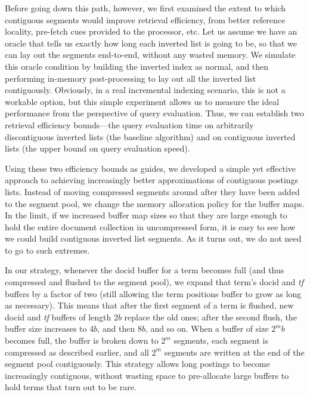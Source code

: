 Before going down this path, however, we first examined the extent to which contiguous segments would improve retrieval efficiency, from better reference locality, pre-fetch cues provided to the processor, etc. Let us assume we have an oracle that tells us exactly how long each inverted list is going to be, so that we can lay out the segments end-to-end, without any wasted memory. We simulate this oracle condition by building the inverted index as normal, and then performing in-memory post-processing to lay out all the inverted list contiguously. Obviously, in a real incremental indexing scenario, this is not a workable option, but this simple experiment allows us to measure the ideal performance from the perspective of query evaluation. Thus, we can establish two retrieval efficiency bounds---the query evaluation time on arbitrarily discontiguous inverted lists (the baseline algorithm) and on contiguous inverted lists (the upper bound on query evaluation speed).

Using these two efficiency bounds as guides, we developed a simple yet effective approach to achieving increasingly better approximations of contiguous postings lists. Instead of moving compressed segments around after they have been added to the segment pool, we change the memory allocation policy for the buffer maps. In the limit, if we increased buffer map sizes so that they are large enough to hold the entire document collection in uncompressed form, it is easy to see how we could build contiguous inverted list segments. As it turns out, we do not need to go to such extremes.

In our strategy, whenever the docid buffer for a term becomes full (and thus compressed and flushed to the segment pool), we expand that term's docid and \textit{tf} buffers by a factor of two (still allowing the term positions buffer to grow as long as necessary). This means that after the first segment of a term is flushed, new docid and \textit{tf} buffers of length $2b$ replace the old ones; after the second flush, the buffer size increases to $4b$, and then $8b$, and so on. When a buffer of size $2^m b$ becomes full, the buffer is broken down to $2^m$ segments, each segment is compressed as described earlier, and all $2^m$ segments are written at the end of the segment pool contiguously. This strategy allows long postings to become increasingly contiguous, without wasting space to pre-allocate large buffers to hold terms that turn out to be rare.

